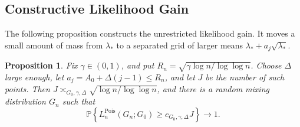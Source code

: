 \documentclass[11pt]{article}
\newtheorem{proposition}[theorem]{Proposition}
\theoremstyle{definition}
\numberwithin{equation}{section}
\begin{document}
\subsection{Constructive Likelihood Gain}
\label{sec:poisson-constructive-gain}

The following proposition constructs the unrestricted likelihood gain. It
moves a small amount of mass from \(\lambda_*\) to a separated grid of larger
means \(\lambda_*+a_j\sqrt{\lambda_*}\).

\begin{proposition}
\label{prop:poisson-finite-constructive}
Fix \(\gamma\in(0,1)\), and put \(R_n=\sqrt{\gamma\log n/\log\log n}\). Choose \(\Delta\) large enough, let \(a_j=A_0+\Delta(j-1)\le R_n\), and let \(J\) be the number of such points. Then \(J\asymp_{G_0,\gamma,\Delta}\sqrt{\log n/\log\log n}\), and there is a random mixing distribution \(G_n\) such that
\[
    \mathbb P\left\{
        L_n^{\mathrm{Pois}}(G_n;G_0)
        \ge c_{G_0,\gamma,\Delta}J
    \right\}\to1.
\]
\end{proposition}
\end{document}

